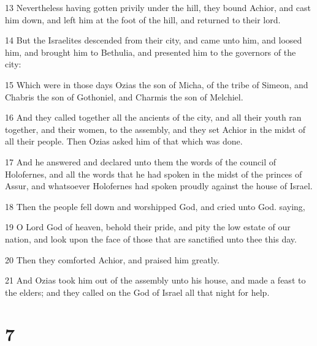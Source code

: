 \par 13 Nevertheless having gotten privily under the hill, they bound Achior, and cast him down, and left him at the foot of the hill, and returned to their lord.
\par 14 But the Israelites descended from their city, and came unto him, and loosed him, and brought him to Bethulia, and presented him to the governors of the city:
\par 15 Which were in those days Ozias the son of Micha, of the tribe of Simeon, and Chabris the son of Gothoniel, and Charmis the son of Melchiel.
\par 16 And they called together all the ancients of the city, and all their youth ran together, and their women, to the assembly, and they set Achior in the midst of all their people. Then Ozias asked him of that which was done.
\par 17 And he answered and declared unto them the words of the council of Holofernes, and all the words that he had spoken in the midst of the princes of Assur, and whatsoever Holofernes had spoken proudly against the house of Israel.
\par 18 Then the people fell down and worshipped God, and cried unto God. saying,
\par 19 O Lord God of heaven, behold their pride, and pity the low estate of our nation, and look upon the face of those that are sanctified unto thee this day.
\par 20 Then they comforted Achior, and praised him greatly.
\par 21 And Ozias took him out of the assembly unto his house, and made a feast to the elders; and they called on the God of Israel all that night for help.

\chapter{7}

